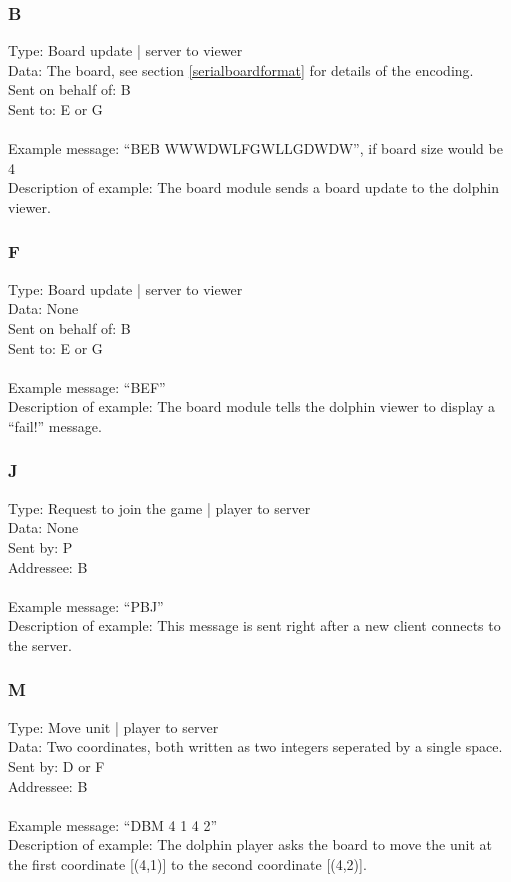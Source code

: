 \documentclass[a4paper,twoside,11pt]{book}
\begin{document}
\subsubsection{B}
Type: Board update | server to viewer \\
Data: The board, see section \ref{serialboardformat} for details of the encoding. \\
Sent on behalf of: B \\
Sent to: E or G \\
\\
Example message: ``BEB WWWDWLFGWLLGDWDW'', if board size would be 4 \\
Description of example: The board module sends a board update to the dolphin viewer.

\subsubsection{F}
Type: Board update | server to viewer \\
Data: None \\
Sent on behalf of: B \\
Sent to: E or G \\
\\
Example message: ``BEF'' \\
Description of example: The board module tells the dolphin viewer to display a ``fail!'' message.

\subsubsection{J}
Type: Request to join the game | player to server \\
Data: None \\
Sent by: P \\
Addressee: B \\
\\
Example message: ``PBJ'' \\
Description of example: This message is sent right after a new client connects to the server.

\subsubsection{M}
Type: Move unit | player to server \\
Data: Two coordinates, both written as two integers seperated by a single space. \\
Sent by: D or F \\
Addressee: B \\
\\
Example message: ``DBM 4 1 4 2'' \\
Description of example: The dolphin player asks the board to move the unit at the first coordinate [(4,1)] to the second coordinate [(4,2)].
\end{document}
